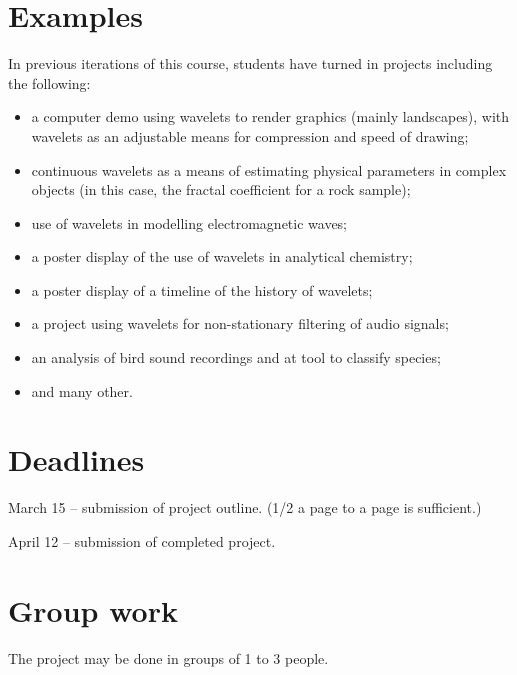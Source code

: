 \documentclass[12pt]{article}
\begin{document}
\section{Examples}
In previous iterations of this course, students have turned in projects including the following:
\begin{itemize}
\item a computer demo using wavelets to render graphics (mainly landscapes), with wavelets as an adjustable means for compression and speed of drawing;
\item continuous wavelets as a means of estimating physical parameters in complex objects (in this case, the fractal coefficient for a rock sample);
\item use of wavelets in modelling electromagnetic waves;
\item a poster display of the use of wavelets in analytical chemistry;
\item a poster display of a timeline of the history of wavelets;
\item a project using wavelets for non-stationary filtering of audio signals;
\item an analysis of bird sound recordings and at tool to classify species;
\item and many other.
\end{itemize}

\section{Deadlines}
March 15 -- submission of project outline. (1/2 a page to a page is sufficient.)

\noindent
April 12 -- submission of completed project.

\section{Group work}
The project may be done in groups of 1 to 3 people.
\end{document}

